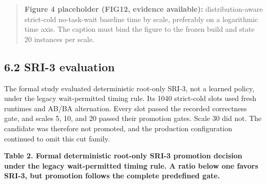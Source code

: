 \documentclass[
  11pt,
]{article}
\begin{document}
\begin{quote}
\textbf{Figure 4 placeholder (FIG12, evidence available):}
distribution-aware strict-cold no-task-wait baseline time by scale,
preferably on a logarithmic time axis. The caption must bind the figure
to the frozen build and state 20 instances per scale.
\end{quote}

\hypertarget{sri-3-evaluation}{%
\subsection{6.2 SRI-3 evaluation}\label{sri-3-evaluation}}

The formal study evaluated deterministic root-only SRI-3, not a learned
policy, under the legacy wait-permitted timing rule. Its 1040
strict-cold slots used fresh runtimes and AB/BA alternation. Every slot
passed the recorded correctness gate, and scales 5, 10, and 20 passed
their promotion gates. Scale 30 did not. The candidate was therefore not
promoted, and the production configuration continued to omit this cut
family.

\textbf{Table 2. Formal deterministic root-only SRI-3 promotion decision
under the legacy wait-permitted timing rule. A ratio below one favors
SRI-3, but promotion follows the complete predefined gate.}
\end{document}
